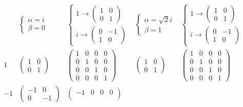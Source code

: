 \documentclass[
]{book}
\theoremstyle{definition}
\theoremstyle{definition}
\theoremstyle{definition}
\theoremstyle{definition}
\theoremstyle{remark}
\begin{document}
\[
\begin{array}{ccccc}
 & \begin{cases}
\alpha=i\\
\beta=0
\end{cases} & \begin{cases}
1\rightarrow\begin{pmatrix}1 & 0\\
0 & 1
\end{pmatrix}\\
i\rightarrow\begin{pmatrix}0 & -1\\
1 & 0
\end{pmatrix}
\end{cases} & \begin{cases}
\alpha=\sqrt{2}i\\
\beta=1
\end{cases} & \begin{cases}
1\rightarrow\begin{pmatrix}1 & 0\\
0 & 1
\end{pmatrix}\\
i\rightarrow\begin{pmatrix}0 & -1\\
1 & 0
\end{pmatrix}
\end{cases}\\
1 & \begin{pmatrix}1 & 0\\
0 & 1
\end{pmatrix} & \begin{pmatrix}1 & 0 & 0 & 0\\
0 & 1 & 0 & 0\\
0 & 0 & 1 & 0\\
0 & 0 & 0 & 1
\end{pmatrix} & \begin{pmatrix}1 & 0\\
0 & 1
\end{pmatrix} & \begin{pmatrix}1 & 0 & 0 & 0\\
0 & 1 & 0 & 0\\
0 & 0 & 1 & 0\\
0 & 0 & 0 & 1
\end{pmatrix}\\
-1 & \begin{pmatrix}-1 & 0\\
0 & -1
\end{pmatrix} & \begin{pmatrix}-1 & 0 & 0 & 0\\

\end{pmatrix}
\end{array}\]
\end{document}
